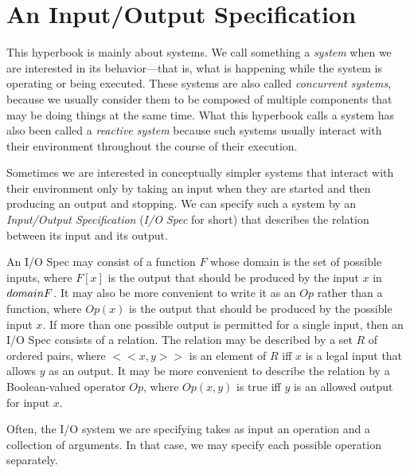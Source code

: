 \documentclass[fleqn,leqno]{article}
\begin{document}
\renewcommand{\contentsname}{The \emph{Specification} Track\protect\target{top}}
\addtocounter{section}{-1}

\showversions
\tableofcontents
\hideversions
\vfill 
\newpage
\section{An Input/Output Specification}

This hyperbook is mainly about systems.  We call something a
\emph{system} when we are interested in its behavior---that is, what
is happening while the system is operating or being executed.  These
systems are also called 
\emph{concurrent systems}, because we usually
consider them to be composed of multiple components that may be doing
things at the same time.  What this hyperbook calls a system has also
been called a 
\emph{reactive system} because such systems usually
interact with their environment throughout the course of their
execution.

Sometimes we are interested in conceptually simpler systems that
interact with their environment only by taking an input when they are
started and then producing an output and stopping.  We can specify
such a system by an 
\emph{Input/Output Specification} (\emph{I/O Spec}
for short) that describes the relation between its input and its
output.

An I/O Spec may consist of a function $F$ whose domain is the set of
possible inputs, where $F[x]$ is the output that should be produced by
the input $x$ in $\DOMAIN F$.  It may also be more convenient to write
it as an
$Op$ rather than a function, where $Op(x)$ is the output that should
be produced by the possible input $x$.  If more than one possible
output is permitted for a single input, then an I/O Spec consists of a
relation.  The relation may be described by a set $R$ of ordered
pairs, where $<<x, y>>$ is an element of $R$ iff $x$ is a legal input
that allows $y$ as an output.  It may be more convenient to describe
the relation by a Boolean-valued operator $Op$, where $Op(x,y)$ is
true iff $y$ is an allowed output for input $x$.

Often, the I/O system we are specifying takes as input an operation
and a collection of arguments.  In that case, we may specify each
possible operation separately.
\end{document}
